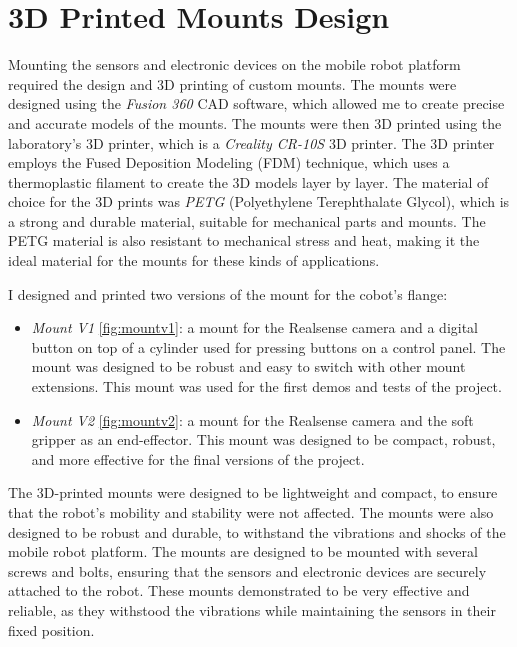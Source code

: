 \section{3D Printed Mounts Design}

Mounting the sensors and electronic devices on the mobile robot platform required the design and 3D printing
of custom mounts. The mounts were designed using the \textit{Fusion 360} CAD software, which allowed me to create
precise and accurate models of the mounts. The mounts were then 3D printed using the laboratory's 3D printer,
which is a \textit{Creality CR-10S} 3D printer. The 3D printer employs the Fused Deposition Modeling (FDM) technique,
which uses a thermoplastic filament to create the 3D models layer by layer. The material of choice
for the 3D prints was \textit{PETG} (Polyethylene Terephthalate Glycol), which is a strong and durable material,
suitable for mechanical parts and mounts. The PETG material is also resistant to mechanical stress and heat,
making it the ideal material for the mounts for these kinds of applications.

I designed and printed two versions of the mount for the cobot's flange:

\begin{itemize}
    \item \textit{Mount V1} \ref{fig:mountv1}: a mount for the Realsense camera and a digital button on top of a cylinder used
    for pressing buttons on a control panel. The mount was designed to be robust and easy to switch with other
    mount extensions. This mount was used for the first demos and tests of the project.
    \item \textit{Mount V2} \ref{fig:mountv2}: a mount for the Realsense camera and the soft gripper as an end-effector.
    This mount was designed to be compact, robust, and more effective for the final versions of the project.
\end{itemize}

The 3D-printed mounts were designed to be lightweight and compact, to ensure that the robot's mobility and stability
were not affected. The mounts were also designed to be robust and durable, to withstand the vibrations and shocks
of the mobile robot platform. The mounts are designed to be
mounted with several screws and bolts, ensuring that the sensors and electronic devices are securely attached to the robot.
These mounts demonstrated to be very effective and reliable, as they withstood the vibrations while maintaining
the sensors in their fixed position.

